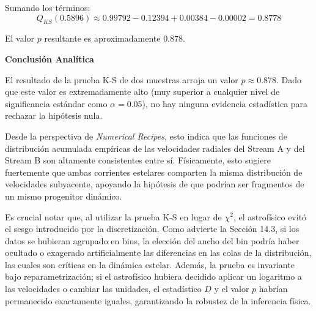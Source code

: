 \documentclass[a4paper]{article}
\begin{document}
Sumando los términos:
$$ Q_{KS}(0.5896) \approx 0.99792 - 0.12394 + 0.00384 - 0.00002 = 0.8778 $$

El valor $p$ resultante es aproximadamente $0.878$.

\textbf{Conclusión Analítica}

El resultado de la prueba K-S de dos muestras arroja un valor $p \approx 0.878$. Dado que este valor es extremadamente alto (muy superior a cualquier nivel de significancia estándar como $\alpha = 0.05$), no hay ninguna evidencia estadística para rechazar la hipótesis nula. 

Desde la perspectiva de \textit{Numerical Recipes}, esto indica que las funciones de distribución acumulada empíricas de las velocidades radiales del Stream A y del Stream B son altamente consistentes entre sí. Físicamente, esto sugiere fuertemente que ambas corrientes estelares comparten la misma distribución de velocidades subyacente, apoyando la hipótesis de que podrían ser fragmentos de un mismo progenitor dinámico.

Es crucial notar que, al utilizar la prueba K-S en lugar de $\chi^2$, el astrofísico evitó el sesgo introducido por la discretización. Como advierte la Sección 14.3, si los datos se hubieran agrupado en bins, la elección del ancho del bin podría haber ocultado o exagerado artificialmente las diferencias en las colas de la distribución, las cuales son críticas en la dinámica estelar. Además, la prueba es invariante bajo reparametrización; si el astrofísico hubiera decidido aplicar un logaritmo a las velocidades o cambiar las unidades, el estadístico $D$ y el valor $p$ habrían permanecido exactamente iguales, garantizando la robustez de la inferencia física.



 
\end{document}
